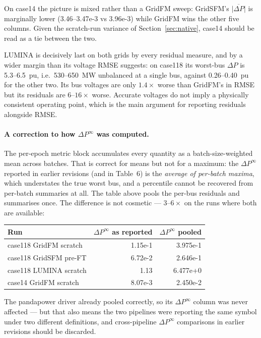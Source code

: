 \documentclass[10pt]{article}
\begin{document}
On case14 the picture is mixed rather than a GridFM sweep: GridSFM's
\(\overline{|\Delta P|}\) is marginally lower (3.46--3.47e-3 vs 3.96e-3) while
GridFM wins the other five columns. Given the scratch-run variance of
Section~\ref{sec:native}, case14 should be read as a tie between the two.

LUMINA is decisively last on both grids by every residual measure, and by a
wider margin than its voltage RMSE suggests: on case118 its worst-bus \(\Delta
P\) is 5.3--6.5~pu, i.e.\ 530--650~MW unbalanced at a single bus, against
0.26--0.40~pu for the other two. Its bus voltages are only \(1.4\times\) worse
than GridFM's in RMSE but its residuals are \(6\)--\(16\times\) worse. Accurate
voltages do not imply a physically consistent operating point, which is the main
argument for reporting residuals alongside RMSE.

\paragraph{A correction to how \(\Delta P^{\infty}\) was computed.} The
per-epoch metric block accumulates every quantity as a batch-size-weighted mean
across batches. That is correct for means but not for a maximum: the
\(\Delta P^{\infty}\) reported in earlier revisions (and in Table~6) is the
\emph{average of per-batch maxima}, which understates the true worst bus, and a
percentile cannot be recovered from per-batch summaries at all. The table above
pools the per-bus residuals and summarises once. The difference is not cosmetic
--- \(3\)--\(6\times\) on the runs where both are available:

\begin{center}
\small
\begin{tabular}{lrr}
\toprule
Run & \(\Delta P^{\infty}\) as reported & \(\Delta P^{\infty}\) pooled \\
\midrule
case118 GridFM scratch  & 1.15e-1 & 3.975e-1 \\
case118 GridSFM pre-FT  & 6.72e-2 & 2.646e-1 \\
case118 LUMINA scratch  & 1.13    & 6.477e+0 \\
case14  GridFM scratch  & 8.07e-3 & 2.450e-2 \\
\bottomrule
\end{tabular}
\end{center}

The pandapower driver already pooled correctly, so its \(\Delta P^{\infty}\)
column was never affected --- but that also means the two pipelines were
reporting the same symbol under two different definitions, and cross-pipeline
\(\Delta P^{\infty}\) comparisons in earlier revisions should be discarded.
\end{document}
